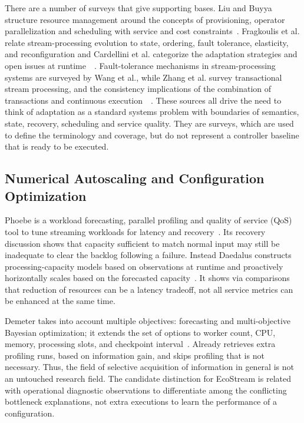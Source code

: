 There are a number of surveys that give supporting bases. Liu and Buyya structure resource management around the concepts of provisioning, operator parallelization and scheduling with service and cost constraints~\cite{liu2020resource}. Fragkoulis et al. relate stream-processing evolution to state, ordering, fault tolerance, elasticity, and reconfiguration and Cardellini et al. categorize the adaptation strategies and open issues at runtime~\cite{fragkoulis2024evolution}~\cite{cardellini2022adaptation}. Fault-tolerance mechanisms in stream-processing systems are surveyed by Wang et al., while Zhang et al. survey transactional stream processing, and the consistency implications of the combination of transactions and continuous execution~\cite{wang2021faulttolerance}~\cite{zhang2023transactional}. These sources all drive the need to think of adaptation as a standard systems problem with boundaries of semantics, state, recovery, scheduling and service quality. They are surveys, which are used to define the terminology and coverage, but do not represent a controller baseline that is ready to be executed.

\subsection{Numerical Autoscaling and Configuration Optimization}
Phoebe is a workload forecasting, parallel profiling and quality of service (QoS) tool to tune streaming workloads for latency and recovery~\cite{geldenhuys2022phoebe}. Its recovery discussion shows that capacity sufficient to match normal input may still be inadequate to clear the backlog following a failure. Instead Daedalus constructs processing-capacity models based on observations at runtime and proactively horizontally scales based on the forecasted capacity~\cite{pfister2024daedalus}. It shows via comparisons that reduction of resources can be a latency tradeoff, not all service metrics can be enhanced at the same time.

Demeter takes into account multiple objectives: forecasting and multi-objective Bayesian optimization; it extends the set of options to worker count, CPU, memory, processing slots, and checkpoint interval~\cite{geldenhuys2024demeter}. Already retrieves extra profiling runs, based on information gain, and skips profiling that is not necessary. Thus, the field of selective acquisition of information in general is not an untouched research field. The candidate distinction for EcoStream is related with operational diagnostic observations to differentiate among the conflicting bottleneck explanations, not extra executions to learn the performance of a configuration.


